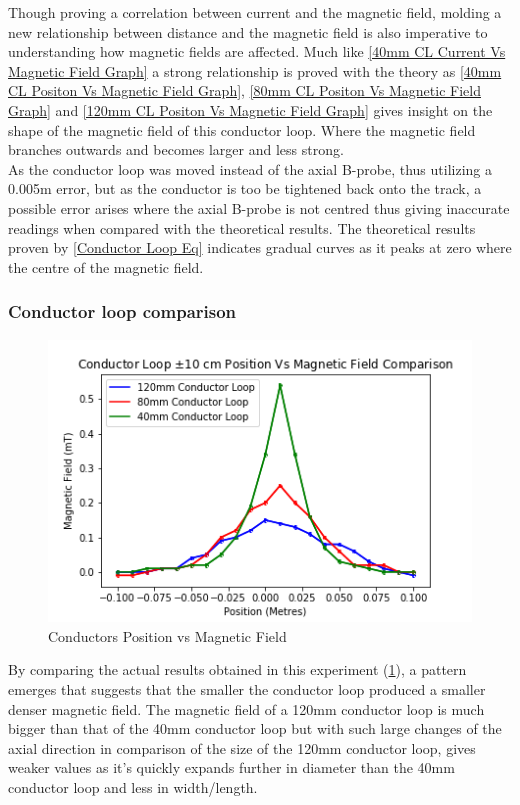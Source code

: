 \documentclass[12pt]{article}
\begin{document}
Though proving a correlation between current and the magnetic field, molding a new relationship between distance and the magnetic field is also imperative to understanding how magnetic fields are affected. Much like \cref{40mm CL Current Vs Magnetic Field Graph} a strong relationship is proved with the theory as \cref{40mm CL Positon Vs Magnetic Field Graph}, \cref{80mm CL Positon Vs Magnetic Field Graph} and \cref{120mm CL Positon Vs Magnetic Field Graph} gives insight on the shape of the magnetic field of this conductor loop. Where the magnetic field branches outwards and becomes larger and less strong. \\

As the conductor loop was moved instead of the axial B-probe, thus utilizing a 0.005m error, but as the conductor is too be tightened back onto the track, a possible error arises where the axial B-probe is not centred thus giving inaccurate readings when compared with the theoretical results. The theoretical results proven by \cref{Conductor Loop Eq} indicates gradual curves as it peaks at zero where the centre of the magnetic field.

\subsubsection{Conductor loop comparison}

\begin{figure}[H]
\centering
\includegraphics[scale=0.9]{Images/Conductors/Conductor_Loop_Comparsion_Graph.png}
\caption{Conductors Position vs Magnetic Field}
\label{Conductors Positon Vs Magnetic Field Graph}
\end{figure}

By comparing the actual results obtained in this experiment (\cref{Conductors Positon Vs Magnetic Field Graph}), a pattern emerges that suggests that the smaller the conductor loop produced a smaller denser magnetic field. The magnetic field of a 120mm conductor loop is much bigger than that of the 40mm conductor loop but with such large changes of the axial direction in comparison of the size of the 120mm conductor loop, gives weaker values as it's quickly expands further in diameter than the 40mm conductor loop and less in width/length.
\end{document}
